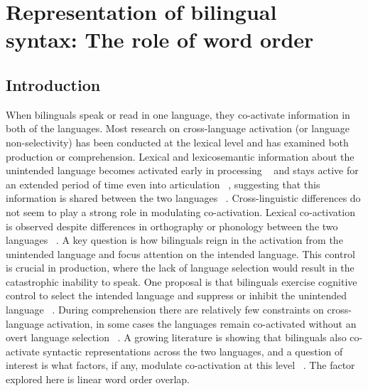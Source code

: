 

\chapter{Representation of bilingual\\ syntax: The role of word order}
\label{representationofbilingualsyntax:theroleofwordorder}

\section{Introduction}
\label{introduction}

When bilinguals speak or read in one language, they co-activate information in both of the languages. Most research on cross-language activation (or language non-selectivity) has been conducted at the lexical level and has examined both production or comprehension. Lexical and lexicosemantic information about the unintended language becomes activated early in processing ~\citep{Duyck2007} and stays active for an extended period of time even into articulation ~\citep{Jacobs2005}, suggesting that this information is shared between the two languages ~\citep[e.g.,][]{Dijkstra2005, Kroll2013}. Cross-linguistic differences do not seem to play a strong role in modulating co-activation. Lexical co-activation is observed despite differences in orthography or phonology between the two languages ~\citep[e.g.,][]{Thierry2007}. A key question is how bilinguals reign in the activation from the unintended language and focus attention on the intended language. This control is crucial in production, where the lack of language selection would result in the catastrophic inability to speak. One proposal is that bilinguals exercise cognitive control to select the intended language and suppress or inhibit the unintended language ~\citep{Abutalebi2007,Green2013}. During comprehension there are relatively few constraints on cross-language activation, in some cases the languages remain co-activated without an overt language selection ~\citep{Duyck2007,VanAssche2010}. A growing literature is showing that bilinguals also co-activate syntactic representations across the two languages, and a question of interest is what factors, if any, modulate co-activation at this level ~\citep{Hartsuiker2004,Bernolet2007}. The factor explored here is linear word order overlap.

